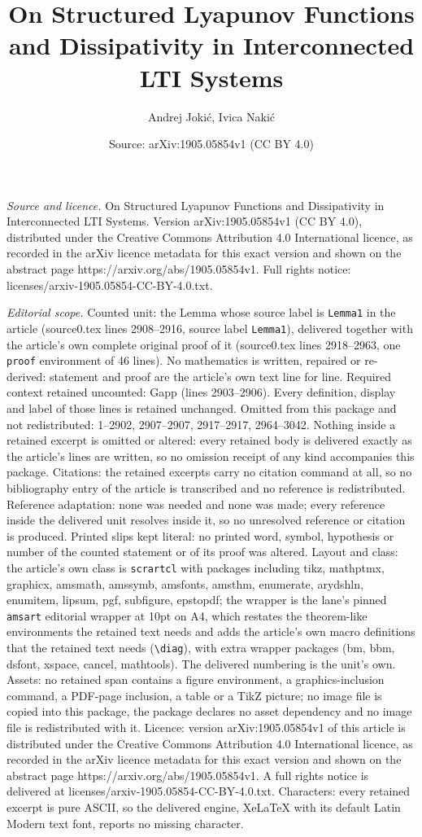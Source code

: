 \documentclass[10pt,a4paper]{amsart}
\title[On Structured Lyapunov Functions and Dissipativity in Interc]{On Structured Lyapunov Functions and Dissipativity in Interconnected LTI Systems}
\author{Andrej Joki\'c, Ivica Naki\'c}
\date{Source: arXiv:1905.05854v1 (CC BY 4.0)}
\begin{document}
\maketitle

\noindent\emph{Source and licence.} On Structured Lyapunov Functions and Dissipativity in Interconnected LTI Systems. Version arXiv:1905.05854v1 (CC BY 4.0), distributed under the Creative Commons Attribution 4.0 International licence, as recorded in the arXiv licence metadata for this exact version and shown on the abstract page https://arxiv.org/abs/1905.05854v1. Full rights notice: licenses/arxiv-1905.05854-CC-BY-4.0.txt.\par\smallskip

\noindent\textit{Editorial scope.} Counted unit: the Lemma whose source label is \texttt{Lemma1} in the article (source0.tex lines 2908--2916, source label \texttt{Lemma1}), delivered together with the article's own complete original proof of it (source0.tex lines 2918--2963, one \texttt{proof} environment of 46 lines). No mathematics is written, repaired or re-derived: statement and proof are the article's own text line for line. Required context retained uncounted: Gapp (lines 2903--2906). Every definition, display and label of those lines is retained unchanged. Omitted from this package and not redistributed: 1--2902, 2907--2907, 2917--2917, 2964--3042. Nothing inside a retained excerpt is omitted or altered: every retained body is delivered exactly as the article's lines are written, so no omission receipt of any kind accompanies this package. Citations: the retained excerpts carry no citation command at all, so no bibliography entry of the article is transcribed and no reference is redistributed. Reference adaptation: none was needed and none was made; every reference inside the delivered unit resolves inside it, so no unresolved reference or citation is produced. Printed slips kept literal: no printed word, symbol, hypothesis or number of the counted statement or of its proof was altered. Layout and class: the article's own class is \texttt{scrartcl} with packages including tikz, mathptmx, graphicx, amsmath, amssymb, amsfonts, amsthm, enumerate, arydshln, enumitem, lipsum, pgf, subfigure, epstopdf; the wrapper is the lane's pinned \texttt{amsart} editorial wrapper at 10pt on A4, which restates the theorem-like environments the retained text needs and adds the article's own macro definitions that the retained text needs (\texttt{\textbackslash diag}), with extra wrapper packages (bm, bbm, dsfont, xspace, cancel, mathtools). The delivered numbering is the unit's own. Assets: no retained span contains a figure environment, a graphics-inclusion command, a PDF-page inclusion, a table or a TikZ picture; no image file is copied into this package, the package declares no asset dependency and no image file is redistributed with it. Licence: version arXiv:1905.05854v1 of this article is distributed under the Creative Commons Attribution 4.0 International licence, as recorded in the arXiv licence metadata for this exact version and shown on the abstract page https://arxiv.org/abs/1905.05854v1. A full rights notice is delivered at licenses/arxiv-1905.05854-CC-BY-4.0.txt. Characters: every retained excerpt is pure ASCII, so the delivered engine, XeLaTeX with its default Latin Modern text font, reports no missing character.
\end{document}
